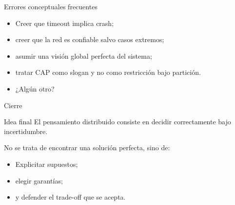 \documentclass[institutional,screen,none]{ua-engineering-v6-beamer}
\begin{document}
\begin{frame}{Errores conceptuales frecuentes}
    \begin{itemize}
        \item Creer que timeout implica crash;
        \item creer que la red es confiable salvo casos extremos;
        \item asumir una visión global perfecta del sistema;
        \item tratar CAP como slogan y no como restricción bajo partición.
        \item ¿Algún otro?
    \end{itemize}
\end{frame}

\begin{frame}{Cierre}
\begin{block}{Idea final}
El pensamiento distribuido consiste en decidir correctamente bajo incertidumbre.
\end{block}

\pause

No se trata de encontrar una solución perfecta, sino de:
\begin{itemize}
\item Explicitar supuestos;
\item elegir garantías;
\item y defender el trade-off que se acepta.
\end{itemize}
\end{frame}
\end{document}
